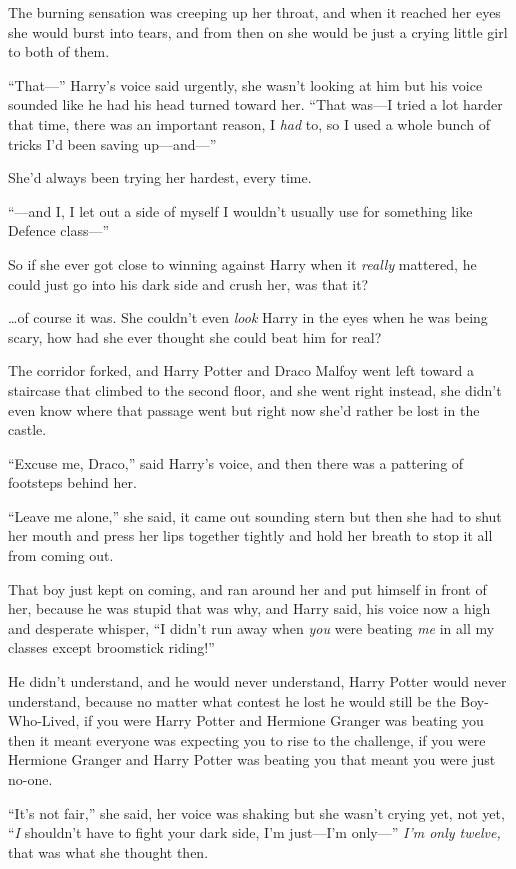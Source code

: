 The burning sensation was creeping up her throat, and when it reached her eyes she would burst into tears, and from then on she would be just a crying little girl to both of them.

“That—” Harry’s voice said urgently, she wasn’t looking at him but his voice sounded like he had his head turned toward her. “That was—I tried a lot harder that time, there was an important reason, I \emph{had} to, so I used a whole bunch of tricks I’d been saving up—and—”

She’d always been trying her hardest, every time.

“—and I, I let out a side of myself I wouldn’t usually use for something like Defence class—”

So if she ever got close to winning against Harry when it \emph{really} mattered, he could just go into his dark side and crush her, was that it?

…of course it was. She couldn’t even \emph{look} Harry in the eyes when he was being scary, how had she ever thought she could beat him for real?

The corridor forked, and Harry Potter and Draco Malfoy went left toward a staircase that climbed to the second floor, and she went right instead, she didn’t even know where that passage went but right now she’d rather be lost in the castle.

“Excuse me, Draco,” said Harry’s voice, and then there was a pattering of footsteps behind her.

“Leave me alone,” she said, it came out sounding stern but then she had to shut her mouth and press her lips together tightly and hold her breath to stop it all from coming out.

That boy just kept on coming, and ran around her and put himself in front of her, because he was stupid that was why, and Harry said, his voice now a high and desperate whisper, “I didn’t run away when \emph{you} were beating \emph{me} in all my classes except broomstick riding!”

He didn’t understand, and he would never understand, Harry Potter would never understand, because no matter what contest he lost he would still be the Boy-Who-Lived, if you were Harry Potter and Hermione Granger was beating you then it meant everyone was expecting you to rise to the challenge, if you were Hermione Granger and Harry Potter was beating you that meant you were just no-one.

“It’s not fair,” she said, her voice was shaking but she wasn’t crying yet, not yet, “\emph{I} shouldn’t have to fight your dark side, I’m just—I’m only—” \emph{I’m only twelve,} that was what she thought then.

